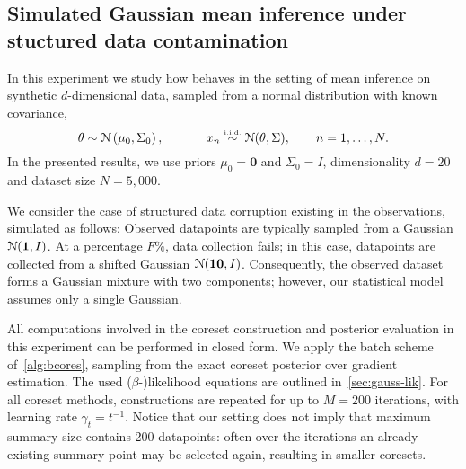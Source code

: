 \subsection{Simulated Gaussian mean inference under stuctured data contamination}
\label{subsec:gauss-expt}

In this experiment we study how \bcores{} behaves in the setting of mean inference on synthetic $d$-dimensional data, sampled \iid from a normal distribution with known covariance,
\[
\theta \sim \distNorm\left(\mu_0, \Sigma_0\right),
\qquad 
\;\;\;\;\;
x_n \distiid \distNorm(\theta, \Sigma),
\qquad
n = 1, \ldots, N.
\label{eq:mvn-expt}
\]
In the presented results, we use priors $\mu_0=\mathbf{0}$ and $\Sigma_0=I$,  dimensionality $d=20$ and dataset size $N=5,000$.
 
We consider the case of structured data corruption existing in the observations, simulated as follows: Observed datapoints are typically sampled from a Gaussian $ \mathcal{N}(\mathbf{1}, I)$. At a percentage $F\%$,  data collection fails; in this case, datapoints are collected from a shifted Gaussian $ \mathcal{N}(\mathbf{10}, I)$. Consequently, the observed dataset forms a Gaussian mixture with two components; however, our statistical model assumes only a single Gaussian.

All computations involved in the coreset construction and posterior evaluation in this experiment can be performed in closed form. We apply the batch scheme of~\cref{alg:bcores}, sampling from the exact coreset posterior over gradient estimation. The used \mbox{($\beta$-)}likelihood equations are outlined in~\cref{sec:gauss-lik}. For all coreset methods, constructions are repeated for up to $M=200$ iterations, with learning rate $\gamma_t = t^{-1}$. Notice that our setting does not imply that maximum summary size contains 200 datapoints: often over the iterations an already existing summary point may be selected again, resulting in smaller coresets.


